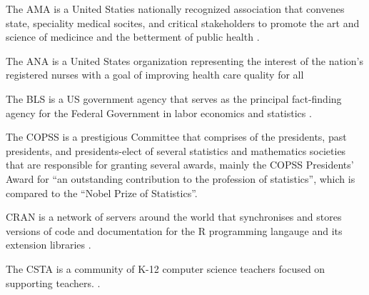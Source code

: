 \documentclass[../main.tex]{subfiles}
\begin{document}

  The AMA is a United Staties nationally recognized association that convenes state, speciality medical socites, and critical stakeholders
  to promote the art and science of medicince and the betterment of public health
  \cite{americanmedicalassociationAmericanMedicalAssociation}.



  The ANA is a United States organization representing the interest of the nation's registered nurses with a
  goal of improving health care quality for all
  \cite{americannursesassociationANAEnterpriseAmerican}



  The BLS is a US government agency that serves as the principal
  fact-finding agency for the Federal Government in labor economics and statistics
  \cite{u.s.bureauoflaborstatisticsBureauLaborStatistics}.



  The COPSS is a prestigious Committee that comprises of the
  presidents, past presidents, and presidents-elect
  of several statistics and mathematics societies that are responsible for granting several awards,
  mainly the COPSS Presidents' Award for
  ``an outstanding contribution to the profession of statistics'',
  which is compared to the ``Nobel Prize of Statistics''.


  CRAN is a network of servers around the world that synchronises and stores versions of code and documentation
  for the R programming langauge and its extension libraries
  \cite{thecomprehensiverarchivenetworkComprehensiveArchiveNetwork}.



  The CSTA is a community of K-12 computer science teachers focused on supporting teachers.
  \cite{csta}.
\end{document}
